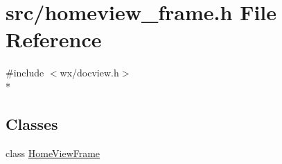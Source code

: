\hypertarget{a00231}{\section{src/homeview\-\_\-frame.h File Reference}
\label{a00231}
}
{\ttfamily \#include $<$wx/docview.\-h$>$}\\*
\subsection*{Classes}
\begin{DoxyCompactItemize}
\item 
class \hyperlink{a00107}{Home\-View\-Frame}
\end{DoxyCompactItemize}
